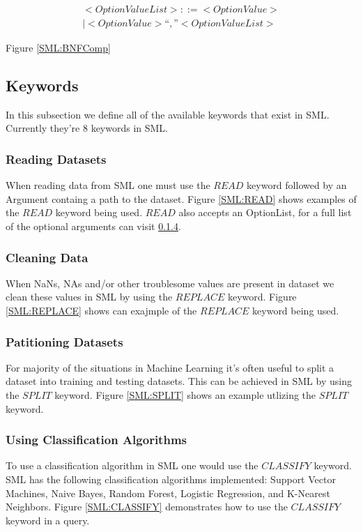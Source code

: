 \documentclass[jair,twoside,11pt,theapa]{article}
\begin{document}
\begin{equation} \label{BNF:OptionValueList}
\begin{split}
<Option Value List> ::= <Option Value> \\
| <Option Value> “,” <Option Value List>
\end{split}
\end{equation}

Figure \ref{SML:BNFComp} %

\subsection{Keywords}
In this subsection we define all of the available keywords that exist in SML. Currently they're 8 keywords in SML.

\subsubsection{Reading Datasets}
When reading data from SML one must use the \(READ\) keyword followed by an Argument containg a path to the dataset. Figure \ref{SML:READ} shows examples of the \(READ\) keyword being used. \(READ\) also accepts an OptionList, for a full list of the optional arguments can visit \ref{}.

\subsubsection{Cleaning Data}
When NaNs, NAs and/or other troublesome values are present in dataset we clean these values in SML by using the \(REPLACE\) keyword. Figure \ref{SML:REPLACE} shows can exajmple of the \(REPLACE\) keyword being used.  

\subsubsection{Patitioning Datasets}
For majority of the situations in Machine Learning it's often useful to split a dataset into training and testing datasets. This can be achieved in SML by using the \(SPLIT\) keyword. Figure \ref{SML:SPLIT} shows an example utlizing the \(SPLIT\) keyword.

\subsubsection{Using Classification Algorithms}
To use a classification algorithm in SML one would use the \(CLASSIFY\) keyword. SML has the following classification algorithms implemented: Support Vector Machines, Naive Bayes, Random Forest, Logistic Regression, and K-Nearest Neighbors. Figure \ref{SML:CLASSIFY} demonstrates how to use the \(CLASSIFY\) keyword in a query.
\end{document}
